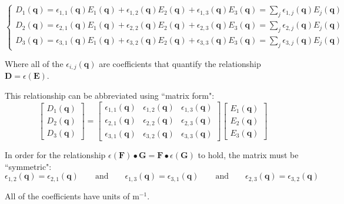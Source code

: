 \[\left\{\begin{array}{c} 
D_1(\mathbf{q}) = \epsilon_{1,1}(\mathbf{q})E_1(\mathbf{q}) + \epsilon_{1,2}(\mathbf{q})E_2(\mathbf{q}) + \epsilon_{1,3}(\mathbf{q})E_3(\mathbf{q}) = \sum_j \epsilon_{1,j}(\mathbf{q})E_j(\mathbf{q}) \\ 
D_2(\mathbf{q}) = \epsilon_{2,1}(\mathbf{q})E_1(\mathbf{q}) + \epsilon_{2,2}(\mathbf{q})E_2(\mathbf{q}) + \epsilon_{2,3}(\mathbf{q})E_3(\mathbf{q}) = \sum_j \epsilon_{2,j}(\mathbf{q})E_j(\mathbf{q}) \\ 
D_3(\mathbf{q}) = \epsilon_{3,1}(\mathbf{q})E_1(\mathbf{q}) + \epsilon_{3,2}(\mathbf{q})E_2(\mathbf{q}) + \epsilon_{3,3}(\mathbf{q})E_3(\mathbf{q}) = \sum_j \epsilon_{3,j}(\mathbf{q})E_j(\mathbf{q}) 
\end{array}\right.\]

Where all of the \(\epsilon_{i,j}(\mathbf{q})\) are coefficients that quantify the relationship \(\mathbf{D} = \epsilon(\mathbf{E})\).

This relationship can be abbreviated using ``matrix form": 
\[\begin{bmatrix} D_1(\mathbf{q}) \\ D_2(\mathbf{q}) \\ D_3(\mathbf{q}) \end{bmatrix} 
= \begin{bmatrix}
\epsilon_{1,1}(\mathbf{q}) & \epsilon_{1,2}(\mathbf{q}) & \epsilon_{1,3}(\mathbf{q}) \\ 
\epsilon_{2,1}(\mathbf{q}) & \epsilon_{2,2}(\mathbf{q}) & \epsilon_{2,3}(\mathbf{q}) \\ 
\epsilon_{3,1}(\mathbf{q}) & \epsilon_{3,2}(\mathbf{q}) & \epsilon_{3,3}(\mathbf{q}) 
\end{bmatrix}
\begin{bmatrix} E_1(\mathbf{q}) \\ E_2(\mathbf{q}) \\ E_3(\mathbf{q}) \end{bmatrix}\]  

In order for the relationship \(\epsilon(\mathbf{F}) \bullet \mathbf{G} = \mathbf{F} \bullet \epsilon(\mathbf{G})\) to hold, the matrix must be ``symmetric":
\[\epsilon_{1,2}(\mathbf{q}) = \epsilon_{2,1}(\mathbf{q}) \quad\quad\text{and}\quad\quad 
\epsilon_{1,3}(\mathbf{q}) = \epsilon_{3,1}(\mathbf{q}) \quad\quad\text{and}\quad\quad 
\epsilon_{2,3}(\mathbf{q}) = \epsilon_{3,2}(\mathbf{q})\] 

All of the coefficients have units of \(\text{m}^{-1}\).



